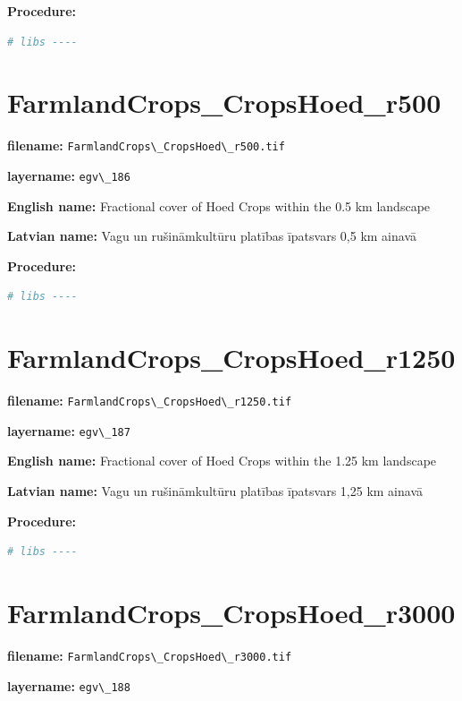 \documentclass[
]{book}
\newcommand{\passthrough}[1]{#1}
\begin{document}
\textbf{Procedure:}

\begin{lstlisting}[language=R]
# libs ----
\end{lstlisting}

\section{FarmlandCrops\_CropsHoed\_r500}\label{ch06.186}

\textbf{filename:} \passthrough{\lstinline!FarmlandCrops\_CropsHoed\_r500.tif!}

\textbf{layername:} \passthrough{\lstinline!egv\_186!}

\textbf{English name:} Fractional cover of Hoed Crops within the 0.5 km landscape

\textbf{Latvian name:} Vagu un rušināmkultūru platības īpatsvars 0,5 km ainavā

\textbf{Procedure:}

\begin{lstlisting}[language=R]
# libs ----
\end{lstlisting}

\section{FarmlandCrops\_CropsHoed\_r1250}\label{ch06.187}

\textbf{filename:} \passthrough{\lstinline!FarmlandCrops\_CropsHoed\_r1250.tif!}

\textbf{layername:} \passthrough{\lstinline!egv\_187!}

\textbf{English name:} Fractional cover of Hoed Crops within the 1.25 km landscape

\textbf{Latvian name:} Vagu un rušināmkultūru platības īpatsvars 1,25 km ainavā

\textbf{Procedure:}

\begin{lstlisting}[language=R]
# libs ----
\end{lstlisting}

\section{FarmlandCrops\_CropsHoed\_r3000}\label{ch06.188}

\textbf{filename:} \passthrough{\lstinline!FarmlandCrops\_CropsHoed\_r3000.tif!}

\textbf{layername:} \passthrough{\lstinline!egv\_188!}
\end{document}
